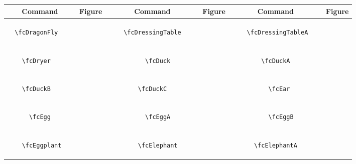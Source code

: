 \documentclass[x11names]{article}
\begin{document}
\begin{table}[H]\centering\begin{tabular}{|c|c|c|c|c|c|}\hline{\bf Command} & {\bf Figure} & {\bf Command} & {\bf Figure} & {\bf Command} & {\bf Figure}\\	\hline	&\multirow{5}{*}{	\fcDragonFly	[scale=0.16]} & &\multirow{5}{*}{	\fcDressingTable	[scale=0.16]} & &\multirow{5}{*}{	\fcDressingTableA	[scale=0.16]}\\	& & & & & \\	& & & & & \\	\verb|	\fcDragonFly	| & & \verb|	\fcDressingTable	| & & \verb|	\fcDressingTableA	| & \\	& & & & & \\	& & & & & \\	& & & & & \\	\hline									
		&\multirow{5}{*}{	\fcDryer	[scale=0.16]} & &\multirow{5}{*}{	\fcDuck	[scale=0.64]} & &\multirow{5}{*}{	\fcDuckA	[scale=0.64]}\\	& & & & & \\	& & & & & \\	\verb|	\fcDryer	| & & \verb|	\fcDuck	| & & \verb|	\fcDuckA	| & \\	& & & & & \\	& & & & & \\	& & & & & \\	\hline									
		&\multirow{5}{*}{	\fcDuckB	[scale=0.64]} & &\multirow{5}{*}{	\fcDuckC	[scale=0.04]} & &\multirow{5}{*}{	\fcEar	[scale=0.16]}\\	& & & & & \\	& & & & & \\	\verb|	\fcDuckB	| & & \verb|	\fcDuckC	| & & \verb|	\fcEar	| & \\	& & & & & \\	& & & & & \\	& & & & & \\	\hline									
		&\multirow{5}{*}{	\fcEgg	[scale=0.36]} & &\multirow{5}{*}{	\fcEggA	[scale=0.64]} & &\multirow{5}{*}{	\fcEggB	[scale=0.64]}\\	& & & & & \\	& & & & & \\	\verb|	\fcEgg	| & & \verb|	\fcEggA	| & & \verb|	\fcEggB	| & \\	& & & & & \\	& & & & & \\	& & & & & \\	\hline									
		&\multirow{5}{*}{	\fcEggplant	[scale=0.16]} & &\multirow{5}{*}{	\fcElephant	[scale=0.64]} & &\multirow{5}{*}{	\fcElephantA	[scale=0.64]}\\	& & & & & \\	& & & & & \\	\verb|	\fcEggplant	| & & \verb|	\fcElephant	| & & \verb|	\fcElephantA	| & \\	& & & & & \\	& & & & & \\	& & & & & \\	\hline									

\end{tabular}
\end{table}
\end{document}
